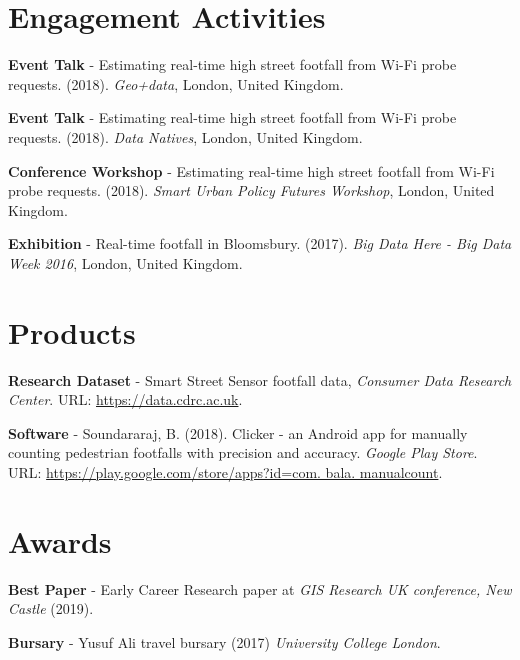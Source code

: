 \section*{Engagement Activities}
\vspace{0.2cm} \par \noindent \textbf{Event Talk} - Estimating real-time high street footfall from Wi-Fi probe requests. (2018). \textit{Geo+data}, London, United Kingdom.
\vspace{0.2cm} \par \noindent \textbf{Event Talk} - Estimating real-time high street footfall from Wi-Fi probe requests. (2018). \textit{Data Natives}, London, United Kingdom.
\vspace{0.2cm} \par \noindent \textbf{Conference Workshop} - Estimating real-time high street footfall from Wi-Fi probe requests. (2018). \textit{Smart Urban Policy Futures Workshop}, London, United Kingdom.
\vspace{0.2cm} \par \noindent \textbf{Exhibition} - Real-time footfall in Bloomsbury. (2017). \textit{Big Data Here - Big Data Week 2016}, London, United Kingdom.

\section*{Products}
\vspace{0.2cm} \par \noindent \textbf{Research Dataset} - Smart Street Sensor footfall data, \textit{Consumer Data Research Center}. URL: \url{https://data.cdrc.ac.uk}.
\vspace{0.2cm} \par \noindent \textbf{Software} - Soundararaj, B. (2018). Clicker - an Android app for manually counting pedestrian footfalls with precision and accuracy. \textit{Google Play Store}. URL: \url{https://play.google.com/store/apps?id=com. bala. manualcount}.

\section*{Awards}
\vspace{0.2cm} \par \noindent \textbf{Best Paper} - Early Career Research paper at \textit{GIS Research UK conference, New Castle} (2019).
\vspace{0.2cm} \par \noindent \textbf{Bursary} - Yusuf Ali travel bursary (2017) \textit{University College London}.


